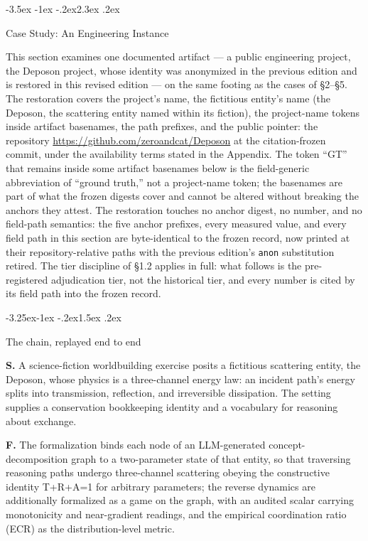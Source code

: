 \documentclass[11pt,a4paper]{article}
\makeatletter
\renewcommand\section{\@startsection{section}{1}{\z@}%
  {-3.5ex \@plus -1ex \@minus -.2ex}{2.3ex \@plus .2ex}%
  {\normalfont\Large\bfseries\raggedright}}
\renewcommand\subsection{\@startsection{subsection}{2}{\z@}%
  {-3.25ex\@plus -1ex \@minus -.2ex}{1.5ex \@plus .2ex}%
  {\normalfont\large\bfseries\raggedright}}
\makeatother
\begin{document}
\section{Case Study: An Engineering Instance}

This section examines one documented artifact — a public engineering project, the Deposon project, whose identity was anonymized in the previous edition and is restored in this revised edition — on the same footing as the cases of §2–§5. The restoration covers the project's name, the fictitious entity's name (the Deposon, the scattering entity named within its fiction), the project-name tokens inside artifact basenames, the path prefixes, and the public pointer: the repository \url{https://github.com/zeroandcat/Deposon} at the citation-frozen commit, under the availability terms stated in the Appendix. The token ``GT'' that remains inside some artifact basenames below is the field-generic abbreviation of ``ground truth,'' not a project-name token; the basenames are part of what the frozen digests cover and cannot be altered without breaking the anchors they attest. The restoration touches no anchor digest, no number, and no field-path semantics: the five anchor prefixes, every measured value, and every field path in this section are byte-identical to the frozen record, now printed at their repository-relative paths with the previous edition's \texttt{anon} substitution retired. The tier discipline of §1.2 applies in full: what follows is the pre-registered adjudication tier, not the historical tier, and every number is cited by its field path into the frozen record.

\subsection{The chain, replayed end to end}

\textbf{S.} A science-fiction worldbuilding exercise posits a fictitious scattering entity, the Deposon, whose physics is a three-channel energy law: an incident path's energy splits into transmission, reflection, and irreversible dissipation. The setting supplies a conservation bookkeeping identity and a vocabulary for reasoning about exchange.

\textbf{F.} The formalization binds each node of an LLM-generated concept-decomposition graph to a two-parameter state of that entity, so that traversing reasoning paths undergo three-channel scattering obeying the constructive identity T+R+A=1 for arbitrary parameters; the reverse dynamics are additionally formalized as a game on the graph, with an audited scalar carrying monotonicity and near-gradient readings, and the empirical coordination ratio (ECR) as the distribution-level metric.
\end{document}
